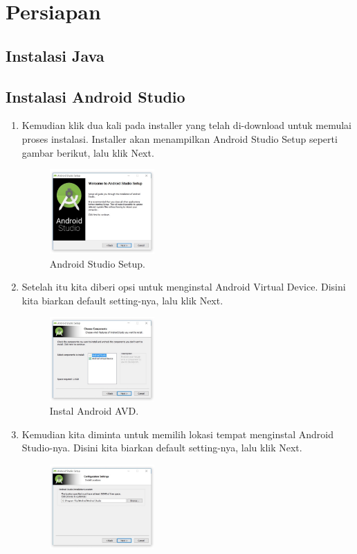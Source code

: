 \section{Persiapan}
\subsection{Instalasi Java}
\subsection{Instalasi Android Studio}
\begin{enumerate}
	\item Kemudian klik dua kali pada installer yang telah di-download untuk memulai proses instalasi. Installer akan menampilkan Android Studio Setup seperti gambar berikut, lalu klik Next. 
	\begin{figure}[H]
		\includegraphics[width=4cm]{figures/installas/1.jpg}
		\centering
		\caption{Android Studio Setup.}
	\end{figure}
	\item Setelah itu kita diberi opsi untuk menginstal Android Virtual Device. Disini kita biarkan default setting-nya, lalu klik Next.
	\begin{figure}[H]
		\includegraphics[width=4cm]{figures/installas/2.jpg}
		\centering
		\caption{Instal Android AVD.}
	\end{figure}
	\item Kemudian kita diminta untuk memilih lokasi tempat menginstal Android Studio-nya. Disini kita biarkan default setting-nya, lalu klik Next.
	\begin{figure}[H]
		\includegraphics[width=4cm]{figures/installas/3.jpg}

\end{figure}
\end{enumerate}
